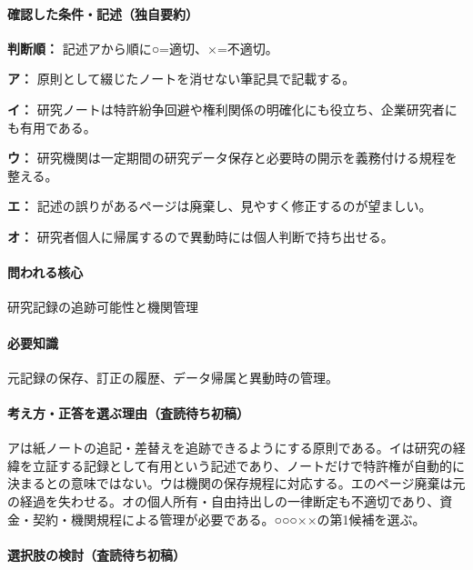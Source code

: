 \paragraph{確認した条件・記述（独自要約）}\mbox{}\par

\noindent\textbf{判断順：} 記述アから順に○=適切、×=不適切。\par

\noindent\textbf{ア：} 原則として綴じたノートを消せない筆記具で記載する。\par

\noindent\textbf{イ：} 研究ノートは特許紛争回避や権利関係の明確化にも役立ち、企業研究者にも有用である。\par

\noindent\textbf{ウ：} 研究機関は一定期間の研究データ保存と必要時の開示を義務付ける規程を整える。\par

\noindent\textbf{エ：} 記述の誤りがあるページは廃棄し、見やすく修正するのが望ましい。\par

\noindent\textbf{オ：} 研究者個人に帰属するので異動時には個人判断で持ち出せる。\par

\paragraph{問われる核心} 研究記録の追跡可能性と機関管理

\paragraph{必要知識} 元記録の保存、訂正の履歴、データ帰属と異動時の管理。

\paragraph{考え方・正答を選ぶ理由（査読待ち初稿）} アは紙ノートの追記・差替えを追跡できるようにする原則である。イは研究の経緯を立証する記録として有用という記述であり、ノートだけで特許権が自動的に決まるとの意味ではない。ウは機関の保存規程に対応する。エのページ廃棄は元の経過を失わせる。オの個人所有・自由持出しの一律断定も不適切であり、資金・契約・機関規程による管理が必要である。○○○××の第1候補を選ぶ。

\paragraph{選択肢の検討（査読待ち初稿）}\mbox{}\par

